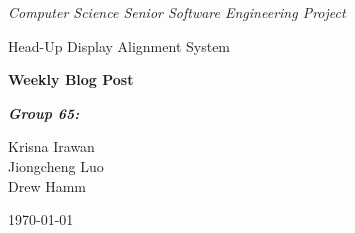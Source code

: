 \documentclass[letterpaper,10pt,onecolumn]{IEEEtran}
\def\title{Computer Science Senior Software Engineering Project}
\def\name{Krisna Irawan\\ Jiongcheng Luo\\ Drew Hamm}
\def\doc{Weekly Blog Post}
\def\project{Head-Up Display Alignment System}
\begin{document}
\begin{titlepage}
\centering
	\vspace{5cm}
	{\huge\itshape \title\par}
	\vspace{2cm}
	\scshape{
		{\huge \project\par}

		\vfill
		{\Huge\bfseries\doc\par}
	}
	\vspace{2cm}
	{\large\itshape\bfseries Group 65:\par}
	{\large \name\par}
	\vfill
	{\large \today\par}


\end{titlepage}
\tableofcontents

\newpage




\end{document}
